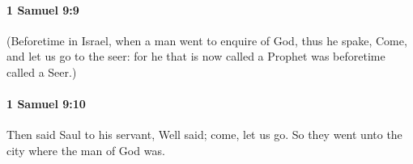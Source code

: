 		\paragraph{1 Samuel 9:9} %
			\label{1SAMUEL-9-9}

			(Beforetime in Israel, when a man went to enquire of God, thus he spake, Come, and let us go to the seer: for he that is now called a Prophet was beforetime called a Seer.)


		\paragraph{1 Samuel 9:10} %
			\label{1SAMUEL-9-10}

			Then said Saul to his servant, Well said; come, let us go. So they went unto the city where the man of God was.


